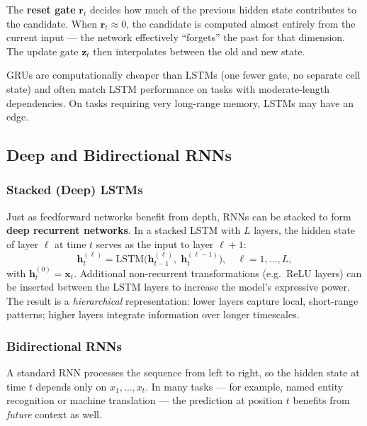 \documentclass[11pt,a4paper]{article}
\newcommand{\term}[1]{\textcolor{DefGreen}{\textbf{#1}}}
\begin{document}
The \term{reset gate} $\mathbf{r}_t$ decides how much of the previous hidden state contributes to the candidate. When $\mathbf{r}_t \approx 0$, the candidate is computed almost entirely from the current input — the network effectively ``forgets'' the past for that dimension. The update gate $\mathbf{z}_t$ then interpolates between the old and new state.

GRUs are computationally cheaper than LSTMs (one fewer gate, no separate cell state) and often match LSTM performance on tasks with moderate-length dependencies. On tasks requiring very long-range memory, LSTMs may have an edge.

\subsection{Deep and Bidirectional RNNs}
\label{sec:deep_bidir_rnn}

\subsubsection{Stacked (Deep) LSTMs}

Just as feedforward networks benefit from depth, RNNs can be stacked to form \term{deep recurrent networks}. In a stacked LSTM with $L$ layers, the hidden state of layer $\ell$ at time $t$ serves as the input to layer $\ell+1$:
\[
  \mathbf{h}_t^{(\ell)} = \mathrm{LSTM}\!\bigl(\mathbf{h}_{t-1}^{(\ell)},\; \mathbf{h}_t^{(\ell-1)}\bigr), \quad \ell = 1, \ldots, L,
\]
with $\mathbf{h}_t^{(0)} = \mathbf{x}_t$. Additional non-recurrent transformations (e.g.\ ReLU layers) can be inserted between the LSTM layers to increase the model's expressive power. The result is a \emph{hierarchical} representation: lower layers capture local, short-range patterns; higher layers integrate information over longer timescales.

\subsubsection{Bidirectional RNNs}

A standard RNN processes the sequence from left to right, so the hidden state at time $t$ depends only on $x_1, \ldots, x_t$. In many tasks — for example, named entity recognition or machine translation — the prediction at position $t$ benefits from \emph{future} context as well.
\end{document}
